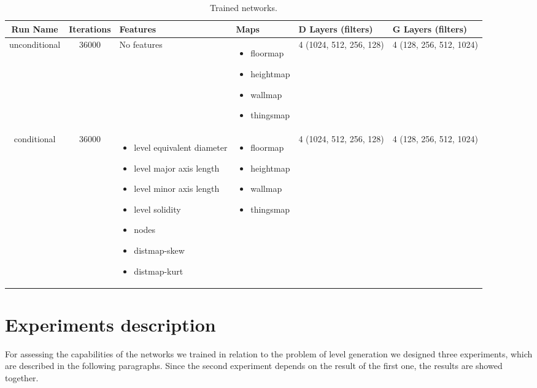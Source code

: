 \begin{table}[h!]
	\begin{tabularx}{\textwidth}{| c | c | X | X | X | X |}
		\hline
		\textbf{Run Name} & \textbf{Iterations} & \textbf{Features} & \textbf{Maps} & \textbf{D Layers (filters)} & \textbf{G Layers (filters)} \\
		\hline
		
		
		
		unconditional & 36000 & 
		No features
		& 
		\begin{itemize}
			\raggedright
			\small
			\item[] floormap
			\item[] heightmap
			\item[] wallmap
			\item[] thingsmap
		\end{itemize}
		& 4 (1024, 512, 256, 128) & 4 (128, 256, 512, 1024)\\
		
		\hline
	
		conditional & 36000 & 
		\begin{itemize}
			\raggedright
			\small
			\item[] level equivalent diameter
			\item[] level major axis length
			\item[] level minor axis length
			\item[] level solidity
			\item[] nodes
			\item[] distmap-skew
			\item[] distmap-kurt
		\end{itemize}
		& 
		\begin{itemize}
			\raggedright
			\small
			\item[] floormap
			\item[] heightmap
			\item[] wallmap
			\item[] thingsmap
		\end{itemize}
		& 4 (1024, 512, 256, 128) & 4 (128, 256, 512, 1024)\\
		
		\hline
		
	\end{tabularx}
	\caption[ Trained Models ]{ Trained networks. }
	\label{tab:trained_models}
\end{table}	

\section{Experiments description}
For assessing the capabilities of the networks we trained in relation to the problem of level generation we designed three experiments, which are described in the following paragraphs. Since the second experiment depends on the result of the first one, the results are showed together.

